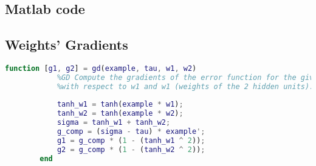 
\begin{appendices}
    \section{Matlab code}
    \subsection{Weights' Gradients}
    \label{sub:gradients}
    \begin{lstlisting}[language=Matlab] 
        function [g1, g2] = gd(example, tau, w1, w2)
            %GD Compute the gradients of the error function for the given example
            %with respect to w1 and w1 (weights of the 2 hidden units).
        
            tanh_w1 = tanh(example * w1);
            tanh_w2 = tanh(example * w2);
            sigma = tanh_w1 + tanh_w2;
            g_comp = (sigma - tau) * example';
            g1 = g_comp * (1 - (tanh_w1 ^ 2));
            g2 = g_comp * (1 - (tanh_w2 ^ 2));
        end
    \end{lstlisting}
\end{appendices}

